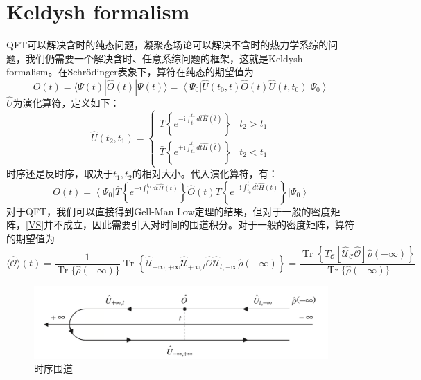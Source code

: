 \documentclass[10pt,openany]{book}
\theoremstyle{thmstyle} %
\theoremstyle{defstyle} %
\theoremstyle{prostyle} %
\begin{document}
\section{Keldysh formalism}
QFT可以解决含时的纯态问题，凝聚态场论可以解决不含时的热力学系综的问题，我们仍需要一个解决含时、任意系综问题的框架，这就是Keldysh formalism。在Schrödinger表象下，算符在纯态的期望值为
\begin{equation*}
  O(t)=\langle\Psi(t)| \hat{O}(t)|\Psi(t)\rangle=\left\langle\Psi_0\right| \hat{U}\left(t_0, t\right) \hat{O}(t) \hat{U}\left(t, t_0\right)\left|\Psi_0\right\rangle
\end{equation*}
$ \hat{U} $为演化算符，定义如下：
\begin{equation}
  \hat{U}\left(t_2, t_1\right)= \begin{cases}T\left\{e^{-\mathrm{i} \int_{t_1}^{t_2} d \bar{t} \hat{H}(\bar{t})}\right\} & t_2>t_1 \\ \bar{T}\left\{e^{+\mathrm{i} \int_{t_2}^{t_1} d \bar{t} \hat{H}(\bar{t})}\right\} & t_2<t_1\end{cases}
\end{equation}
时序还是反时序，取决于$ t_1,t_2 $的相对大小。代入演化算符，有：
\begin{equation*}
  O(t)=\left\langle\Psi_0\right| \bar{T}\left\{e^{-\mathrm{i} \int_t^{t_0} d \bar{t} \hat{H}(t)}\right\} \hat{O}(t) T\left\{e^{-\mathrm{i} \int_{t_0}^t d \hat{t} \hat{H}(t)}\right\}\left|\Psi_0\right\rangle
\end{equation*}  
对于QFT，我们可以直接得到Gell-Man Low定理的结果，但对于一般的密度矩阵，\ref{VS}并不成立，因此需要引入对时间的围道积分。对于一般的密度矩阵，算符的期望值为
\begin{equation*}
  \langle\hat{\mathcal{O}}\rangle(t)=\frac{1}{\operatorname{Tr}\{\hat{\rho}(-\infty)\}} \operatorname{Tr}\left\{\hat{\mathcal{U}}_{-\infty,+\infty} \hat{\mathcal{U}}_{+\infty, t} \hat{\mathcal{O}} \hat{\mathcal{U}}_{t,-\infty} \hat{\rho}(-\infty)\right\}=\frac{\operatorname{Tr}\left\{T_{\mathcal{C}}[\hat{\mathcal{U}}_{\mathcal{C}} \hat{\mathcal{O}}]\hat{\rho}(-\infty)\right\}}{\operatorname{Tr}\{\hat{\rho}(-\infty)\}}
\end{equation*}
\begin{figure}
  \includegraphics[scale=0.8]{Figures/Time contour.png}
  \caption{时序围道}
\end{figure}
\end{document}
